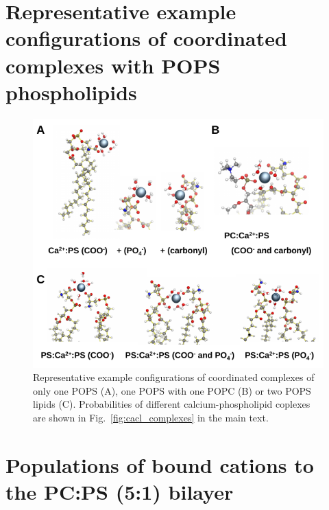 \documentclass[journal=jctcce,manuscript=article]{achemso}
\newlength{\figwidth}
\newlength{\figwidthfull}
\begin{document}
\pagebreak




\section{Representative example configurations of  coordinated complexes with POPS phospholipids}

\begin{figure}[!h] 
  \centering 
  \includegraphics[width=\figwidthfull]{../img/populations_stoichiometry_structures_SI.pdf}
  \caption{\label{fig:strcutures_SI} 
    Representative example configurations of  coordinated complexes 
    of only one POPS (A), one POPS with one POPC (B) or two POPS lipids (C). 
    Probabilities of different calcium-phospholipid coplexes are shown in Fig.~\ref{fig:cacl_complexes} in the main text. 
  }
\end{figure} 


\pagebreak
\section{Populations of bound  cations to the PC:PS (5:1) bilayer}
\end{document}
